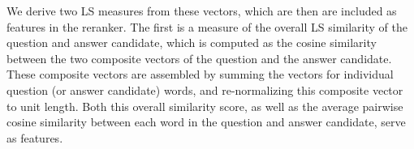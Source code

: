 We derive two LS measures from these vectors, which are then are included as features in the reranker.  The first is a measure of the overall LS similarity of the question and answer candidate, which is computed as the cosine similarity between the two composite vectors of the question and the answer candidate.  These composite vectors are assembled by summing the vectors for individual question (or answer candidate) words, and re-normalizing this composite vector to unit length.  Both this overall similarity score, as well as the average pairwise cosine similarity between each word in the question and answer candidate, serve as features. 


%

